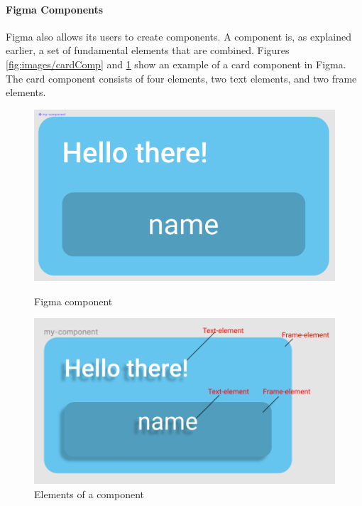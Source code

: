 \paragraph{Figma Components}%
\label{ssub:Figma Components}
Figma also allows its users to create \glspl{component}. A \gls{component} is, as explained earlier, a set of fundamental elements that are combined. Figures \ref{fig:images/cardComp} and \ref{fig:images/cardCompElements} show an example of a card\cite{babichSimpleDesignTips2020} \gls{component} in Figma. The card \gls{component} consists of four elements, two text elements, and two frame elements. 

\begin{figure}[H]
  \centering
  \begin{minipage}[b]{0.48\textwidth}
    \includegraphics[width=\linewidth]{images/cardComp.png}
    \caption{Figma component}
    \label{fig:images/cardComp}
  \end{minipage}
  \hfill
  \begin{minipage}[b]{0.48\textwidth}
    \includegraphics[width=\linewidth]{images/cardCompElements.png}
    \caption{Elements of a component}
    \label{fig:images/cardCompElements}
  \end{minipage}
\end{figure}


